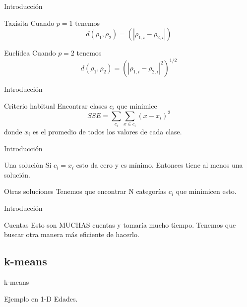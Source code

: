 \documentclass[]{beamer}
\begin{document}
\begin{frame}{Introducción}
  \begin{exampleblock}{Taxisita}
    Cuando $p=1$ tenemos
    \begin{equation}
      d(\rho_1, \rho_2) = \left( | \rho_{1,i} - \rho_{2,i} | \right)
    \end{equation}
  \end{exampleblock}\pause
  \begin{exampleblock}{Euclídea}
    Cuando $p=2$ tenemos
    \begin{equation}
      d(\rho_1, \rho_2) = \left( | \rho_{1,i} - \rho_{2,i} |^2 \right)^{1/2}
    \end{equation}
  \end{exampleblock}
\end{frame}

\begin{frame}{Introducción}
  \begin{block}{Criterio habitual}
    Encontrar clases $c_i$ que minimice
      \begin{equation}
          SSE = \sum_{c_i} \sum_{x \in c_i} (x-x_i)^2
      \end{equation}
       donde $x_i$ es el promedio de todos los valores de cada clase.
  \end{block}
\end{frame}

\begin{frame}{Introducción}
  \begin{exampleblock}{Una solución}
    Si $c_i = {x_i}$ esto da cero y es mínimo. Entonces tiene al menos una solución.
  \end{exampleblock}\pause
  \begin{block}{Otras soluciones}
    Tenemos que encontrar N categorías $c_i$ que minimicen esto.
  \end{block}
\end{frame}

\begin{frame}{Introducción}
  \begin{block}{Cuentas}
    Esto son MUCHAS cuentas y tomaría mucho tiempo. \pause Tenemos que buscar otra manera más eficiente de hacerlo.
  \end{block}
\end{frame}

\subsection{k-means}
\begin{frame}{k-means}
  \begin{exampleblock}{Ejemplo en 1-D}
    Edades.
  \end{exampleblock}
\end{frame}
\end{document}
